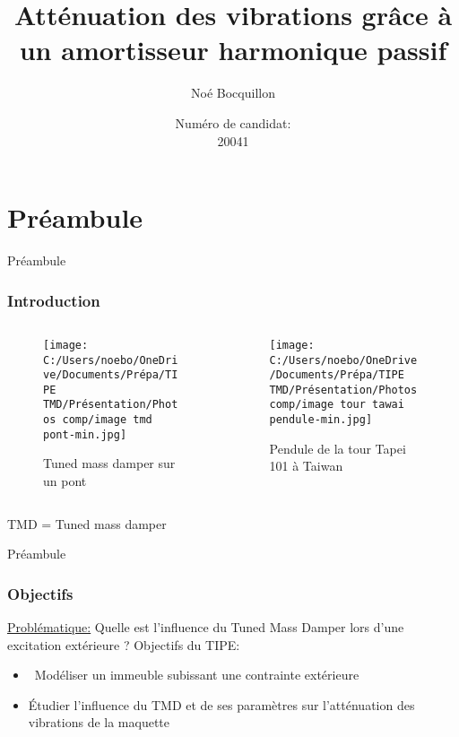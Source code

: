 \documentclass{beamer}
\title[]
{Atténuation des vibrations grâce à
	un amortisseur harmonique passif}
\subtitle{}
\author{Noé Bocquillon} %
\date[n°20041] %
{Numéro de candidat:\\ 20041}
\begin{document}
	
	\frame{\titlepage}
	\section{Préambule}
	\begin{frame}{Préambule}
		\frametitle{Introduction}
		
		
		\begin{columns}[T]
			\begin{column}{0.45\textwidth}
				\begin{figure}
					\centering
					\texttt{[image: C:/Users/noebo/OneDrive/Documents/Prépa/TIPE TMD/Présentation/Photos comp/image tmd pont-min.jpg]}
					\caption{Tuned mass damper sur un pont}
				\end{figure}
				
			\end{column}
			\begin{column}{0.45\textwidth}
				\begin{figure}
					\centering
					\caption{ Pendule de la tour Tapei 101 à Taiwan}
					\texttt{[image: C:/Users/noebo/OneDrive/Documents/Prépa/TIPE TMD/Présentation/Photos comp/image tour tawai pendule-min.jpg]}
				\end{figure}
			\end{column}
		\end{columns}
		\bigskip\small TMD = Tuned mass damper
	\end{frame}
	
	\begin{frame}{Préambule}
		\frametitle{Objectifs}
		\underline{Problématique:} Quelle est l'influence du Tuned Mass Damper lors d'une excitation extérieure ? 
		\vspace{12pt}
		\linebreak[3]Objectifs du TIPE:
		\begin{itemize}
			\item\ Modéliser un immeuble subissant une contrainte extérieure
			\item Étudier l'influence du TMD et de ses paramètres sur l'atténuation des vibrations de la maquette
			
		\end{itemize}
		
	\end{frame}
	
\end{document}
